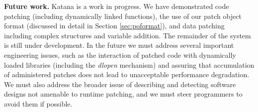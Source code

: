 {\bf Future work.} Katana is a work in progress.
We have demonstrated code patching (including dynamically linked
functions), the use of our patch object format (discussed in detail in
Section \ref{sec:poformat}), and data patching including complex
structures and variable addition. The remainder of the system is still
under development. In the future we
must address several 
important engineering issues, such as the interaction of patched code with
dynamically loaded libraries (including the {\em dlopen} mechanism)
and assuring that accumulation of administered patches does not lead to
unacceptable performance degradation. 
We must also address the broader issue of describing and detecting
software designs not amenable to runtime patching, and we must steer
programmers to avoid them if possible.
